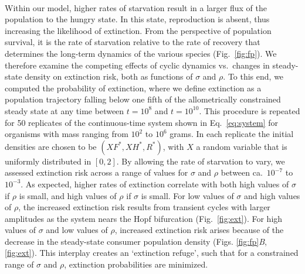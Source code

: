 \documentclass{pnastwo}
\begin{document}
\begin{article}
\\
Within our model, higher rates of starvation result in a larger flux of the population to the hungry state.
In this state, reproduction is absent, thus increasing the likelihood of extinction.  From the perspective of population survival, it is the rate of starvation relative to the rate of recovery that determines the long-term dynamics of the various species (Fig.~\ref{fig:fp}).
We therefore examine the competing effects of cyclic dynamics vs.\ changes in steady-state density on extinction risk, both as functions of $\sigma$ and $\rho$.
To this end, we computed the probability of extinction, where we define extinction as a population trajectory falling below one fifth of the allometrically constrained steady state at any time between $t=10^8$ and $t=10^{10}$.
This procedure is repeated for 50 replicates of the continuous-time system shown in Eq.~\ref{eq:system} for organisms with mass ranging from $10^2$ to $10^6$ grams.
In each replicate the initial densities are chosen to be $(XF^*,XH^*,R^*)$, with $X$ a random variable that is uniformly distributed in $[0,2]$.
By allowing the rate of starvation to vary, we assessed extinction risk across a range of values for $\sigma$ and $\rho$ between ca.\ $10^{-7}$ to $10^{-3}$. %
As expected, higher rates of extinction correlate with both high values of $\sigma$ if $\rho$ is small, and high values of $\rho$ if $\sigma$ is small.
For low values of $\sigma$ and high values of $\rho$, the increased extinction risk results from transient cycles with larger amplitudes as the system nears the Hopf bifurcation (Fig.~\ref{fig:ext}).
For high values of $\sigma$ and low values of $\rho$, increased extinction risk arises because of the decrease in the steady-state consumer population density (Figs. \ref{fig:fp}\emph{B}, \ref{fig:ext}).
This interplay creates an `extinction refuge', such that for a constrained range of $\sigma$ and $\rho$, extinction probabilities are minimized.


\end{article}
\end{document}
